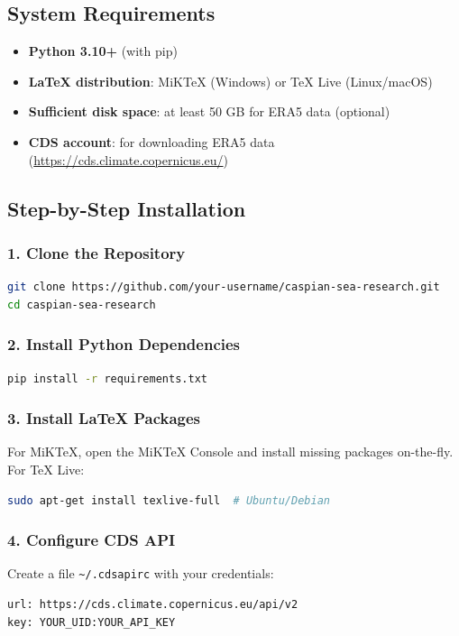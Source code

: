 \documentclass[12pt,a4paper]{article}
\begin{document}
\subsection{System Requirements}
\begin{itemize}
    \item \textbf{Python 3.10+} (with pip)
    \item \textbf{LaTeX distribution}: MiKTeX (Windows) or TeX Live (Linux/macOS)
    \item \textbf{Sufficient disk space}: at least 50 GB for ERA5 data (optional)
    \item \textbf{CDS account}: for downloading ERA5 data (\url{https://cds.climate.copernicus.eu/})
\end{itemize}

\subsection{Step-by-Step Installation}
\subsubsection{1. Clone the Repository}
\begin{lstlisting}[language=bash]
git clone https://github.com/your-username/caspian-sea-research.git
cd caspian-sea-research
\end{lstlisting}

\subsubsection{2. Install Python Dependencies}
\begin{lstlisting}[language=bash]
pip install -r requirements.txt
\end{lstlisting}

\subsubsection{3. Install LaTeX Packages}
For MiKTeX, open the MiKTeX Console and install missing packages on-the-fly. For TeX Live:
\begin{lstlisting}[language=bash]
sudo apt-get install texlive-full  # Ubuntu/Debian
\end{lstlisting}

\subsubsection{4. Configure CDS API}
Create a file \texttt{\textasciitilde/.cdsapirc} with your credentials:
\begin{lstlisting}
url: https://cds.climate.copernicus.eu/api/v2
key: YOUR_UID:YOUR_API_KEY
\end{lstlisting}
\end{document}
